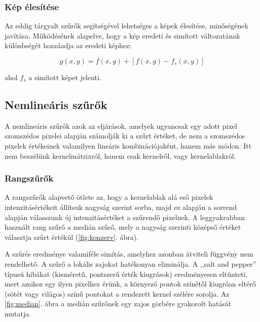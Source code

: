 \documentclass[a4paper,12pt]{article}
\begin{document}
\subsubsection{Kép élesítése}

Az eddig tárgyalt szűrők segítségével lehetséges a képek élesítése, minőségének
javítása. Működésének alapelve, hogy a kép eredeti és simított változatának
különbségét hozzáadja az eredeti képhez:

$$g(x,y)=f(x,y)+ \left[ f(x,y)-f_s(x,y) \right]$$

ahol $f_s$ a simított képet jelenti. 


\subsection{Nemlineáris szűrők}

A nemlineáris szűrők azok az eljárások, amelyek ugyancsak egy adott pixel
szomszédos pixelei alapján számolják ki a szűrt értéket, de nem a szomszédos
pixelek értékeinek valamilyen lineáris kombinációjaként, hanem más módon. Itt
nem beszélünk kernelmátrixról, hanem csak kernelről, vagy kernelablakról.

\subsubsection{Rangszűrők}

A rangszűrők alapvető ötlete az, hogy a kernelablak alá eső pixelek
intenzitásértékeit állítsuk nagyság szerint sorba, majd ez alapján a sorrend
alapján válasszunk új intenzitásértéket a szűrendő pixelnek. A leggyakrabban
használt rang szűrő a medián szűrő, mely a nagyság szerinti középső értéket
választja szűrt értékül (\ref{fig:konzerv}. ábra). 

A szűrés eredménye valamiféle simítás, amelyhez azonban átviteli függvény nem
rendelhető. A szűrő a lokális zajokat hatékonyan eliminálja. A ,,salt and
pepper'' típusú hibákat (kisméretű, pontszerű érték kiugrások) eredményesen
eltünteti, mert amikor egy ilyen pixelhez érünk, a környező pontok színétől
kiugróan eltérő (sötét vagy világos) színű pontokat a rendezett kernel szélére
sorolja. Az \ref{fig:median}. ábra a medián szűrőnek egy zajos görbére
gyakorolt hatását mutatja.
\end{document}
